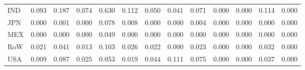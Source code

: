 \begin{table}[htbp]
\begin{tabular}{lcccccccccccc}
  IND & \textcolor[RGB]{30,19,225}{0.093} & \textcolor[RGB]{4,3,251}{0.187} & \textcolor[RGB]{38,25,217}{0.074} & \textcolor[RGB]{0,0,255}{0.630} & \textcolor[RGB]{21,14,234}{0.112} & \textcolor[RGB]{55,36,200}{0.050} & \textcolor[RGB]{66,43,189}{0.041} & \textcolor[RGB]{40,26,215}{0.071} & \textcolor[RGB]{255,165,0}{0.000} & \textcolor[RGB]{255,165,0}{0.000} & \textcolor[RGB]{17,11,238}{0.114} & \textcolor[RGB]{255,165,0}{0.000} \\ 
  JPN & \textcolor[RGB]{113,73,142}{0.000} & \textcolor[RGB]{106,69,149}{0.001} & \textcolor[RGB]{255,165,0}{0.000} & \textcolor[RGB]{34,22,221}{0.078} & \textcolor[RGB]{100,65,155}{0.008} & \textcolor[RGB]{255,165,0}{0.000} & \textcolor[RGB]{255,165,0}{0.000} & \textcolor[RGB]{102,66,153}{0.004} & \textcolor[RGB]{255,165,0}{0.000} & \textcolor[RGB]{255,165,0}{0.000} & \textcolor[RGB]{255,165,0}{0.000} & \textcolor[RGB]{255,165,0}{0.000} \\ 
  MEX & \textcolor[RGB]{115,74,140}{0.000} & \textcolor[RGB]{255,165,0}{0.000} & \textcolor[RGB]{255,165,0}{0.000} & \textcolor[RGB]{57,37,198}{0.049} & \textcolor[RGB]{255,165,0}{0.000} & \textcolor[RGB]{255,165,0}{0.000} & \textcolor[RGB]{255,165,0}{0.000} & \textcolor[RGB]{115,74,140}{0.000} & \textcolor[RGB]{255,165,0}{0.000} & \textcolor[RGB]{255,165,0}{0.000} & \textcolor[RGB]{255,165,0}{0.000} & \textcolor[RGB]{255,165,0}{0.000} \\ 
  RoW & \textcolor[RGB]{87,56,168}{0.021} & \textcolor[RGB]{68,44,187}{0.041} & \textcolor[RGB]{94,61,162}{0.013} & \textcolor[RGB]{28,18,227}{0.103} & \textcolor[RGB]{79,51,176}{0.026} & \textcolor[RGB]{85,55,170}{0.022} & \textcolor[RGB]{110,72,144}{0.000} & \textcolor[RGB]{83,54,172}{0.023} & \textcolor[RGB]{255,165,0}{0.000} & \textcolor[RGB]{255,165,0}{0.000} & \textcolor[RGB]{77,50,178}{0.032} & \textcolor[RGB]{255,165,0}{0.000} \\ 
  USA & \textcolor[RGB]{98,63,157}{0.009} & \textcolor[RGB]{32,21,223}{0.087} & \textcolor[RGB]{81,52,174}{0.025} & \textcolor[RGB]{53,34,202}{0.053} & \textcolor[RGB]{91,59,164}{0.019} & \textcolor[RGB]{64,41,191}{0.044} & \textcolor[RGB]{23,15,232}{0.111} & \textcolor[RGB]{36,23,219}{0.075} & \textcolor[RGB]{255,165,0}{0.000} & \textcolor[RGB]{255,165,0}{0.000} & \textcolor[RGB]{72,47,183}{0.037} & \textcolor[RGB]{255,165,0}{0.000} \\ 
   \hline
\end{tabular}
\end{table}
